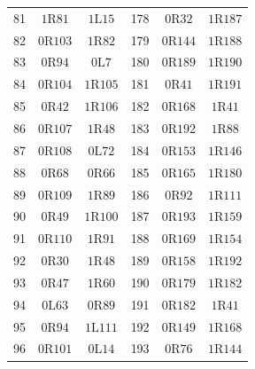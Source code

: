 \begin{longtable}{@{}rcc@{\qquad\qquad}rcc@{}}
81 & $1\mathrm{R}81$ & $1\mathrm{L}15$ & 178 & $0\mathrm{R}32$ & $1\mathrm{R}187$ \\
82 & $0\mathrm{R}103$ & $1\mathrm{R}82$ & 179 & $0\mathrm{R}144$ & $1\mathrm{R}188$ \\
83 & $0\mathrm{R}94$ & $0\mathrm{L}7$ & 180 & $0\mathrm{R}189$ & $1\mathrm{R}190$ \\
84 & $0\mathrm{R}104$ & $1\mathrm{R}105$ & 181 & $0\mathrm{R}41$ & $1\mathrm{R}191$ \\
85 & $0\mathrm{R}42$ & $1\mathrm{R}106$ & 182 & $0\mathrm{R}168$ & $1\mathrm{R}41$ \\
86 & $0\mathrm{R}107$ & $1\mathrm{R}48$ & 183 & $0\mathrm{R}192$ & $1\mathrm{R}88$ \\
87 & $0\mathrm{R}108$ & $0\mathrm{L}72$ & 184 & $0\mathrm{R}153$ & $1\mathrm{R}146$ \\
88 & $0\mathrm{R}68$ & $0\mathrm{R}66$ & 185 & $0\mathrm{R}165$ & $1\mathrm{R}180$ \\
89 & $0\mathrm{R}109$ & $1\mathrm{R}89$ & 186 & $0\mathrm{R}92$ & $1\mathrm{R}111$ \\
90 & $0\mathrm{R}49$ & $1\mathrm{R}100$ & 187 & $0\mathrm{R}193$ & $1\mathrm{R}159$ \\
91 & $0\mathrm{R}110$ & $1\mathrm{R}91$ & 188 & $0\mathrm{R}169$ & $1\mathrm{R}154$ \\
92 & $0\mathrm{R}30$ & $1\mathrm{R}48$ & 189 & $0\mathrm{R}158$ & $1\mathrm{R}192$ \\
93 & $0\mathrm{R}47$ & $1\mathrm{R}60$ & 190 & $0\mathrm{R}179$ & $1\mathrm{R}182$ \\
94 & $0\mathrm{L}63$ & $0\mathrm{R}89$ & 191 & $0\mathrm{R}182$ & $1\mathrm{R}41$ \\
95 & $0\mathrm{R}94$ & $1\mathrm{L}111$ & 192 & $0\mathrm{R}149$ & $1\mathrm{R}168$ \\
96 & $0\mathrm{R}101$ & $0\mathrm{L}14$ & 193 & $0\mathrm{R}76$ & $1\mathrm{R}144$ \\
\end{longtable}
\endgroup

